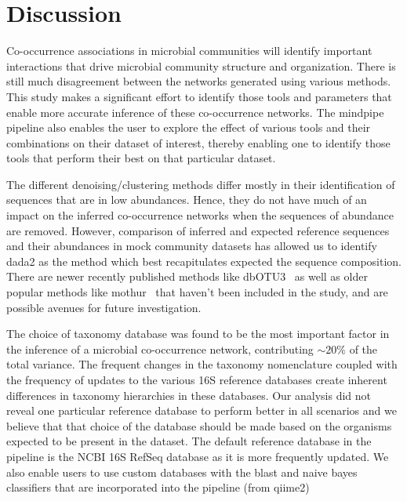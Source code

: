
\section*{Discussion}


Co-occurrence associations in microbial communities will identify important interactions that drive microbial community structure and organization.
There is still much disagreement between the networks generated using various methods.
This study makes a significant effort to identify those tools and parameters that enable more accurate inference of these co-occurrence networks.
The mindpipe pipeline also enables the user to explore the effect of various tools and their combinations on their dataset of interest, thereby enabling one to identify those tools that perform their best on that particular dataset.

The different denoising/clustering methods differ mostly in their identification of sequences that are in low abundances.
Hence, they do not have much of an impact on the inferred co-occurrence networks when the sequences of abundance are removed.
However, comparison of inferred and expected reference sequences and their abundances in mock community datasets has allowed us to identify \ac{dada2} as the method which best recapitulates expected the sequence composition.
There are newer recently published methods like dbOTU3~\cite{Olesen2017} as well as older popular methods like mothur~\cite{Schloss2009} that haven't been included in the study, and are possible avenues for future investigation.

The choice of taxonomy database was found to be the most important factor in the inference of a microbial co-occurrence network, contributing $\sim20\%$ of the total variance.
The frequent changes in the taxonomy nomenclature coupled with the frequency of updates to the various 16S reference databases create inherent differences \cite{Balvociute2017} in taxonomy hierarchies in these databases.
Our analysis did not reveal one particular reference database to perform better in all scenarios and we believe that that choice of the database should be made based on the organisms expected to be present in the dataset.
The default reference database in the pipeline is the NCBI 16S RefSeq database as it is more frequently updated.
We also enable users to use custom databases \cite{Griffen2011,Ritari2015} with the blast and naive bayes classifiers that are incorporated into the pipeline (from \ac{qiime2})

